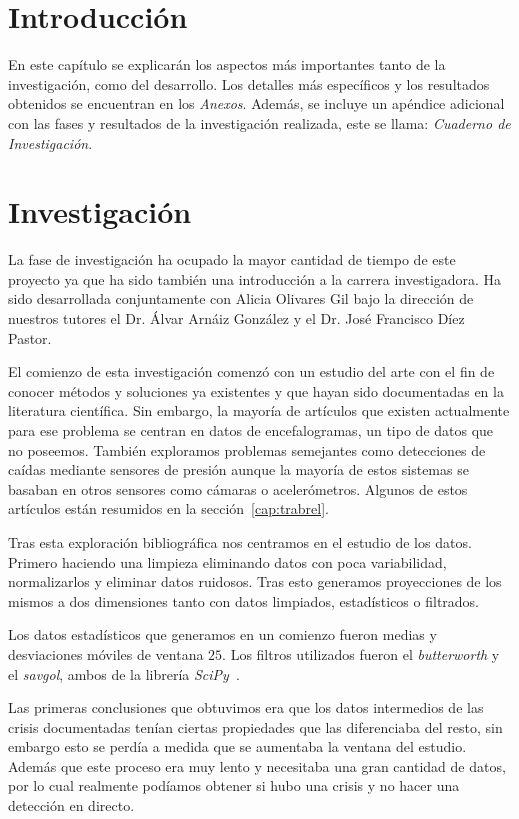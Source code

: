 \section{Introducción}\label{cap:asp-rel}

En este capítulo se explicarán los aspectos más importantes tanto de la investigación, como del desarrollo. Los detalles más específicos y los resultados obtenidos se encuentran en los \textit{Anexos}. Además, se incluye un apéndice adicional con las fases y resultados de la investigación realizada, este se llama: \textit{Cuaderno de Investigación}.

\section{Investigación}

La fase de investigación ha ocupado la mayor cantidad de tiempo de este proyecto ya que ha sido también una introducción a la carrera investigadora. Ha sido desarrollada conjuntamente con Alicia Olivares Gil bajo la dirección de nuestros tutores el Dr. Álvar Arnáiz González y el Dr. José Francisco Díez Pastor.

El comienzo de esta investigación comenzó con un estudio del arte con el fin de conocer métodos y soluciones ya existentes y que hayan sido documentadas en la literatura científica. Sin embargo, la mayoría de artículos que existen actualmente para ese problema se centran en datos de encefalogramas, un tipo de datos que no poseemos. También exploramos problemas semejantes como detecciones de caídas mediante sensores de presión aunque la mayoría de estos sistemas se basaban en otros sensores como cámaras o acelerómetros. Algunos de estos artículos están resumidos en la sección~\ref{cap:trabrel}.

Tras esta exploración bibliográfica nos centramos en el estudio de los datos. Primero haciendo una limpieza eliminando datos con poca variabilidad, normalizarlos y eliminar datos ruidosos. Tras esto generamos proyecciones de los mismos a dos dimensiones tanto con datos limpiados, estadísticos o filtrados.

Los datos estadísticos que generamos en un comienzo fueron medias y desviaciones móviles de ventana $25$. Los filtros utilizados fueron el \textit{butterworth} y el \textit{savgol}, ambos de la librería \textit{SciPy}~\cite{tool:scipy}.

Las primeras conclusiones que obtuvimos era que los datos intermedios de las crisis documentadas tenían ciertas propiedades que las diferenciaba del resto, sin embargo esto se perdía a medida que se aumentaba la ventana del estudio. Además que este proceso era muy lento y necesitaba una gran cantidad de datos, por lo cual realmente podíamos obtener si hubo una crisis y no hacer una detección en directo.

